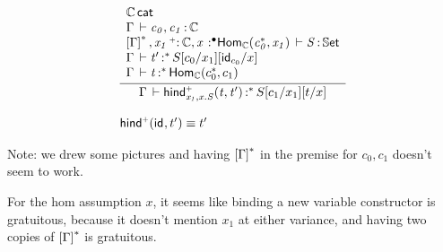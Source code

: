 \documentclass[11pt]{article}
\theoremstyle{plain}
\begin{document}

\[
\begin{array}{l}
\infer{\oftpe{\Gamma}{\morindco{x_1,x.S}{t}{t'}}{\vcond}{{\subst{\subst{S}{c_1}{x_1}}{t}{x}}}}
      { \begin{array}{l}
          \wfdtp{\C} \\
          \oftp{\Gamma}{c_0,c_1}{\C} \\
          \ofdtp{\dupctx{\Gamma}{\vcond},\vtptm{x_1}{\co}{\C},\tptmv{x}{\bullet}{\Hom{\C}{c_0^\vcond}{x_1}}}{S}{\types} \\
          \oftpe{\Gamma}{t'}{\vcond}{{\subst{\subst{S}{c_0}{x_1}}{\idm{c_0}}{x}}} \\
          \oftpe{\Gamma}{t}{\vcond}{\Hom{\C}{c_0^\vcond}{c_1}} \\
        \end{array}
      }
\\ \\
\morindco{}{\idm{}}{t'} \deq t'
\end{array}
\]

Note: we drew some pictures and having $\left[\Gamma\right]^{{\mathord{*}}}$ in the
premise for $c_0,c_1$ doesn't seem to work.

For the hom assumption $x$, it seems like binding a new variable
constructor is gratuitous, because it doesn't mention $x_1$ at either
variance, and having two copies of $\left[\Gamma\right]^{{\mathord{*}}}$ is
gratuitous.

\end{document}
